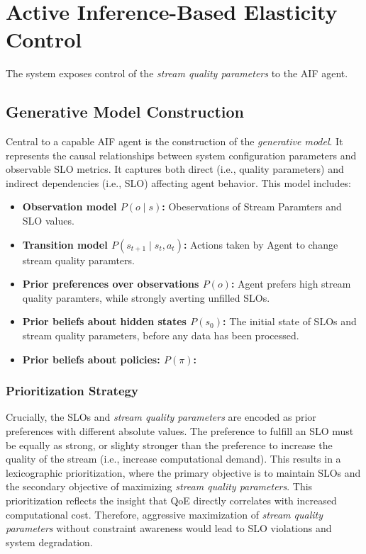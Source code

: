\section{Active Inference-Based Elasticity Control}

The system exposes control of the \textit{stream quality parameters} to the AIF agent.

\subsection{Generative Model Construction}
Central to a capable AIF agent is the construction of the \textit{generative model}. It represents the causal relationships between system configuration parameters and observable SLO metrics. It captures both direct (i.e., quality parameters) and indirect dependencies (i.e., SLO) affecting agent behavior. This model includes:
\begin{itemize}
  \item \textbf{Observation model \(P(o \mid s)\):} Obeservations of Stream Paramters and SLO values.
  \item \textbf{Transition model \(P(s_{t+1} \mid s_t,a_t)\):} Actions taken by Agent to change stream quality paramters.
  \item \textbf{Prior preferences over observations \(P(o)\):} Agent prefers high stream quality paramters, while strongly averting unfilled SLOs.
  \item \textbf{Prior beliefs about hidden states \(P(s_0)\):} The initial state of SLOs and stream quality parameters, before any data has been processed.
  \item \textbf{Prior beliefs about policies: \(P(\pi)\):} 
\end{itemize}

\subsubsection{Prioritization Strategy}
Crucially, the SLOs and \textit{stream quality parameters} are encoded as prior preferences with different absolute values. The preference to fulfill an SLO must be equally as strong, or slighty stronger than the preference to increase the quality of the stream (i.e., increase computational demand). This results in a lexicographic prioritization, where the primary objective is to maintain SLOs and the secondary objective of maximizing \textit{stream quality parameters}. This prioritization reflects the insight that QoE directly correlates with increased computational cost. Therefore, aggressive maximization of \textit{stream quality parameters} without constraint awareness would lead to SLO violations and system degradation.

